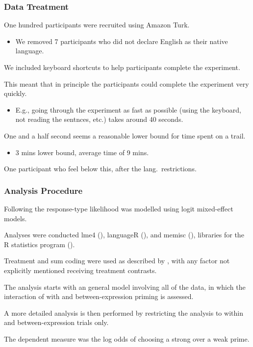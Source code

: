 \documentclass[noamssymb]{beamer}
\begin{document}
\begin{frame}
  \frametitle{{\ftf Data Treatment}}

One hundred participants were recruited using Amazon Turk.
\begin{itemize}
\item We removed 7 participants who did not declare English as their native language.
\end{itemize}


We included keyboard shortcuts to help participants complete the experiment.

This  meant that in principle the participants could complete the experiment very quickly.
\begin{itemize}
\item E.g., going through the experiment as fast as possible (using the keyboard, not reading the sentnces, etc.) takes around 40 seconds.
\end{itemize}
One and a half second seems a reasonable lower bound for time spent on a trail.
\begin{itemize}
\item 3 mins lower bound, average time of 9 mins.
\end{itemize}
  One participant who feel below this, after the lang.\ restrictions.

\end{frame}



\begin{frame}
  \frametitle{{\ftf Analysis Procedure}}

  Following \citeauthor{Bott:2016aa} the response-type likelihood was modelled using logit mixed-effect models.

  Analyses were conducted lme4 (\cite{Bates:2014aa}), languageR (\cite{Baayen:2011aa}), and memisc (\cite{Elff:2012aa}), libraries for the R statistics program (\cite{Team:2013aa}).

  Treatment and sum coding were used as described by \citeauthor{Bott:2016aa}, with any factor not explicitly mentioned receiving treatment contrasts.

  The analysis starts with an general model involving all of the data, in which the interaction of with and between-expression priming is assessed.

  A more detailed analysis is then performed by restricting the analysis to within and between-expression trials only.

  The dependent measure was the log odds of choosing a strong over a weak prime.

\end{frame}
\end{document}
